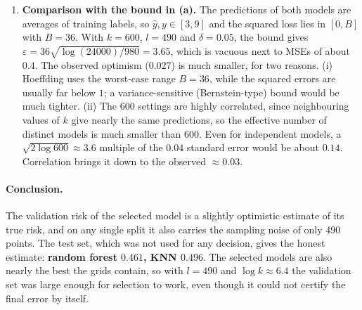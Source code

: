 \documentclass[11pt]{article}
\begin{document}
\begin{enumerate}
\item \textbf{Comparison with the bound in (a).} The predictions of both models are averages of
training labels, so $\hat y,y\in[3,9]$ and the squared loss lies in $[0,B]$ with $B=36$. With
$k=600$, $l=490$ and $\delta=0.05$, the bound gives $\varepsilon=36\sqrt{\log(24000)/980}=3.65$,
which is vacuous next to MSEs of about $0.4$. The observed optimism ($0.027$) is much smaller, for
two reasons. (i) Hoeffding uses the worst-case range $B=36$, while the squared errors are usually
far below $1$; a variance-sensitive (Bernstein-type) bound would be much tighter. (ii) The 600
settings are highly correlated, since neighbouring values of $k$ give nearly the same predictions,
so the effective number of distinct models is much smaller than $600$. Even for independent models,
a $\sqrt{2\log600}\approx3.6$ multiple of the $0.04$ standard error would be about $0.14$.
Correlation brings it down to the observed $\approx0.03$.
\end{enumerate}

\paragraph{Conclusion.} The validation risk of the selected model is a slightly optimistic
estimate of its true risk, and on any single split it also carries the sampling noise of only 490
points. The test set, which was not used for any decision, gives the honest estimate:
\textbf{random forest $0.461$, KNN $0.496$}. The selected models are also nearly the best the grids
contain, so with $l=490$ and $\log k\approx6.4$ the validation set was large enough for selection to
work, even though it could not certify the final error by itself.
\end{document}
